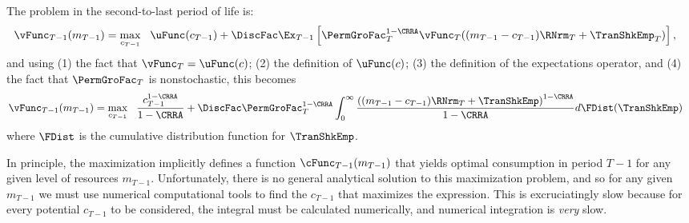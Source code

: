 \documentclass[titlepage, headings=optiontotocandhead]{\econtex}
\begin{document}
The problem in the second-to-last period of life is:
\begin{equation*}\begin{gathered}\begin{aligned}
      \null{\vFunc}_{T-1}({m}_{T-1})  & = \max_{{c}_{T-1}} ~~ \uFunc({c}_{T-1}) +
      \DiscFac \Ex_{T-1} \left[\PermGroFac_{T}^{1-\CRRA}\null{\vFunc}_{T}(({m}_{T-1} - {c}_{T-1})\RNrm_{T} + \TranShkEmp_{T})\right],
    \end{aligned}\end{gathered}\end{equation*}
and using (1) the fact that $\vFunc_{T}=\uFunc(c)$; (2) the definition of $\uFunc(c)$; (3) the
definition of the expectations operator, and (4) the fact that $\PermGroFac_{T}$ is nonstochastic, this becomes
\begin{equation*}\begin{gathered}\begin{aligned}
      \null{\vFunc}_{T-1}({m}_{T-1})   & = \max_{{c}_{T-1}} ~~
      \frac{{c}_{T-1}^{1-\CRRA}}{1-\CRRA} + \DiscFac \PermGroFac_{T}^{1-\CRRA}\int_{0}^{\infty}
      \frac{\left(({m}_{T-1}-{c}_{T-1})\RNrm_{T}+ \TranShkEmp\right)^{1-\CRRA}}{1-\CRRA}
      d\FDist(\TranShkEmp)
    \end{aligned}\end{gathered}\end{equation*}
where $\FDist$ is the cumulative distribution function for ${\TranShkEmp}$.

In principle, the maximization implicitly defines a function $\cFunc_{T-1}({m}_{T-1})$ that yields optimal consumption in period $T-1$ for any given level of resources ${m}_{T-1}$.  Unfortunately, there is no general analytical solution to this maximization problem, and so for any given ${m}_{T-1}$ we must use numerical computational tools to find the ${c}_{T-1}$ that maximizes the expression.  This is excruciatingly slow because for every potential ${c}_{T-1}$ to be considered, the integral must be calculated numerically, and numerical integration is \textit{very} slow.

\hypertarget{Discretizing-the-Distribution}{}
\end{document}
